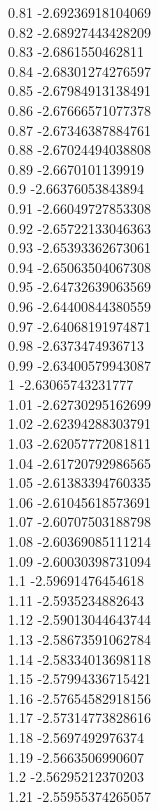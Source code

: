 {0.81	-2.69236918104069\\
0.82	-2.68927443428209\\
0.83	-2.6861550462811\\
0.84	-2.68301274276597\\
0.85	-2.67984913138491\\
0.86	-2.67666571077378\\
0.87	-2.67346387884761\\
0.88	-2.67024494038808\\
0.89	-2.6670101139919\\
0.9	-2.66376053843894\\
0.91	-2.66049727853308\\
0.92	-2.65722133046363\\
0.93	-2.65393362673061\\
0.94	-2.65063504067308\\
0.95	-2.64732639063569\\
0.96	-2.64400844380559\\
0.97	-2.64068191974871\\
0.98	-2.6373474936713\\
0.99	-2.63400579943087\\
1	-2.63065743231777\\
1.01	-2.62730295162699\\
1.02	-2.62394288303791\\
1.03	-2.62057772081811\\
1.04	-2.61720792986565\\
1.05	-2.61383394760335\\
1.06	-2.61045618573691\\
1.07	-2.60707503188798\\
1.08	-2.60369085111214\\
1.09	-2.60030398731094\\
1.1	-2.59691476454618\\
1.11	-2.5935234882643\\
1.12	-2.59013044643744\\
1.13	-2.58673591062784\\
1.14	-2.58334013698118\\
1.15	-2.57994336715421\\
1.16	-2.57654582918156\\
1.17	-2.57314773828616\\
1.18	-2.5697492976374\\
1.19	-2.5663506990607\\
1.2	-2.56295212370203\\
1.21	-2.55955374265057\\
}
